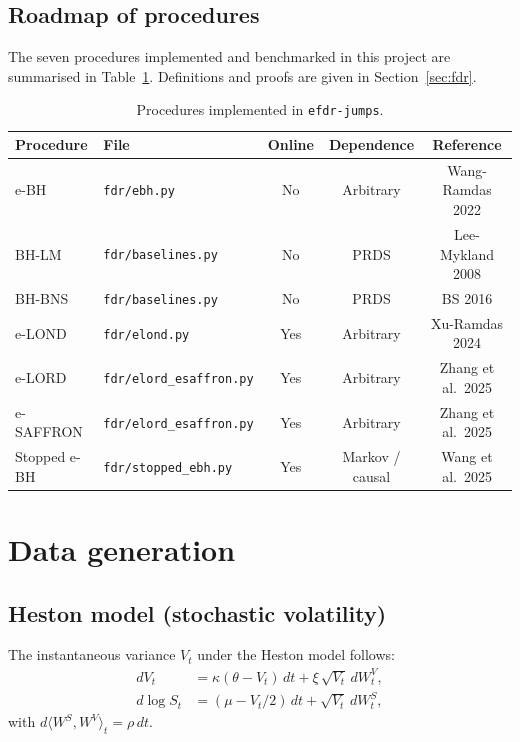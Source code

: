 \documentclass[11pt,a4paper]{article}
\theoremstyle{plain}
\theoremstyle{definition}
\theoremstyle{remark}
\begin{document}
\subsection{Roadmap of procedures}

The seven procedures implemented and benchmarked in this project are
summarised in Table~\ref{tab:procs}. Definitions and proofs are given in
Section~\ref{sec:fdr}.

\begin{table}[H]
\centering
\caption{Procedures implemented in \texttt{efdr-jumps}.}
\label{tab:procs}
\begin{tabular}{llccc}
\toprule
Procedure & File & Online & Dependence & Reference \\
\midrule
e-BH & \texttt{fdr/ebh.py} & No & Arbitrary & Wang-Ramdas 2022 \\
BH-LM & \texttt{fdr/baselines.py} & No & PRDS & Lee-Mykland 2008 \\
BH-BNS & \texttt{fdr/baselines.py} & No & PRDS & BS 2016 \\
e-LOND & \texttt{fdr/elond.py} & Yes & Arbitrary & Xu-Ramdas 2024 \\
e-LORD & \texttt{fdr/elord\_esaffron.py} & Yes & Arbitrary & Zhang et al.\ 2025 \\
e-SAFFRON & \texttt{fdr/elord\_esaffron.py} & Yes & Arbitrary & Zhang et al.\ 2025 \\
Stopped e-BH & \texttt{fdr/stopped\_ebh.py} & Yes & Markov / causal & Wang et al.\ 2025 \\
\bottomrule
\end{tabular}
\end{table}


\section{Data generation}
\label{sec:simulation}

\subsection{Heston model (stochastic volatility)}

The instantaneous variance $V_t$ under the Heston model follows:
\begin{align}
  dV_t &= \kappa(\theta - V_t)\,dt + \xi\,\sqrt{V_t}\,dW_t^V,\\
  d\log S_t &= (\mu - V_t/2)\,dt + \sqrt{V_t}\,dW_t^S,
\end{align}
with $d\langle W^S, W^V \rangle_t = \rho\,dt$.
\end{document}
